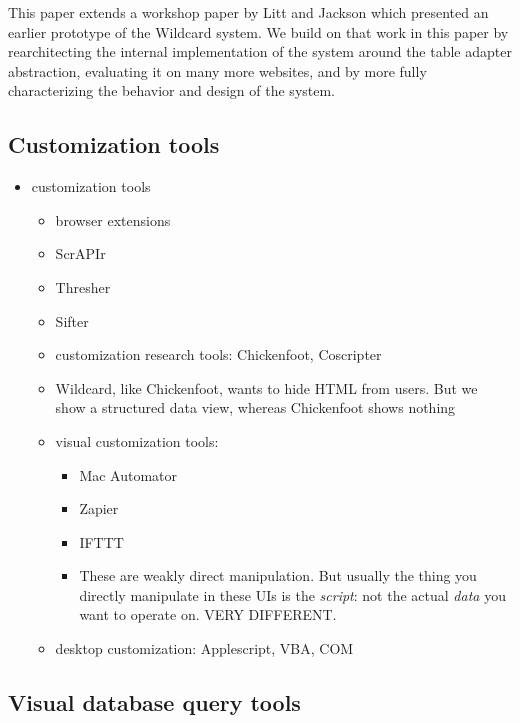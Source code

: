 \documentclass[sigplan,10pt,anonymous,review]{acmart}
\providecommand{\tightlist}{%
  \setlength{\itemsep}{0pt}\setlength{\parskip}{0pt}}
\begin{document}
This paper extends a workshop paper by Litt and Jackson \citep{litt2020}
which presented an earlier prototype of the Wildcard system. We build on
that work in this paper by rearchitecting the internal implementation of
the system around the table adapter abstraction, evaluating it on many
more websites, and by more fully characterizing the behavior and design
of the system.

\hypertarget{customization-tools}{%
\subsection{Customization tools}\label{customization-tools}}

\begin{itemize}
\tightlist
\item
  customization tools

  \begin{itemize}
  \tightlist
  \item
    browser extensions
  \item
    ScrAPIr
  \item
    Thresher
  \item
    Sifter
  \item
    customization research tools: Chickenfoot, Coscripter
  \item
    Wildcard, like Chickenfoot, wants to hide HTML from users. But we
    show a structured data view, whereas Chickenfoot shows nothing
  \item
    visual customization tools:

    \begin{itemize}
    \tightlist
    \item
      Mac Automator
    \item
      Zapier
    \item
      IFTTT
    \item
      These are weakly direct manipulation. But usually the thing you
      directly manipulate in these UIs is the \emph{script}: not the
      actual \emph{data} you want to operate on. VERY DIFFERENT.
    \end{itemize}
  \item
    desktop customization: Applescript, VBA, COM
  \end{itemize}
\end{itemize}

\hypertarget{visual-database-query-tools}{%
\subsection{Visual database query
tools}\label{visual-database-query-tools}}
\end{document}
